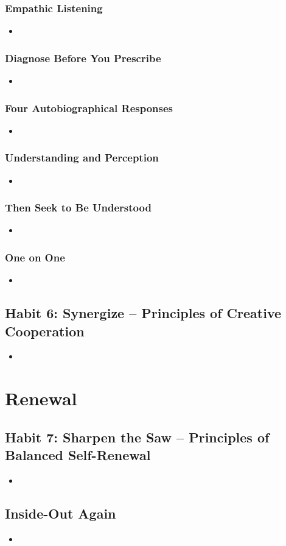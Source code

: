 \documentclass[11pt]{article}
\begin{document}
\subsubsection{Empathic Listening}
\begin{itemize}
\item 
\end{itemize}
\subsubsection{Diagnose Before You Prescribe}
\begin{itemize}
\item 
\end{itemize}
\subsubsection{Four Autobiographical Responses}
\begin{itemize}
\item 
\end{itemize}
\subsubsection{Understanding and Perception}
\begin{itemize}
\item 
\end{itemize}
\subsubsection{Then Seek to Be Understood}
\begin{itemize}
\item 
\end{itemize}
\subsubsection{One on One}
\begin{itemize}
\item 
\end{itemize}
\subsection{Habit 6: Synergize -- Principles of Creative Cooperation}
\begin{itemize}
\item 
\end{itemize}
\section{Renewal}
\subsection{Habit 7: Sharpen the Saw -- Principles of Balanced Self-Renewal}
\begin{itemize}
\item 
\end{itemize}
\subsection{Inside-Out Again}
\begin{itemize}
\item 
\end{itemize}
\newpage


\end{document}
